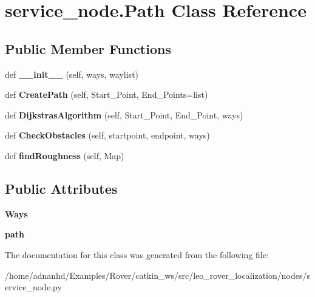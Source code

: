 \hypertarget{classservice__node_1_1Path}{}\section{service\+\_\+node.\+Path Class Reference}
\label{classservice__node_1_1Path}
\subsection*{Public Member Functions}
\begin{DoxyCompactItemize}
\item 
\mbox{\label{classservice__node_1_1Path_ac66df455e00a98279d5db61985b8b3ff}} 
def {\bfseries \+\_\+\+\_\+init\+\_\+\+\_\+} (self, ways, waylist)
\item 
\mbox{\label{classservice__node_1_1Path_a9947fd0a2a144ef57cd75ed3f68829e0}} 
def {\bfseries Create\+Path} (self, Start\+\_\+\+Point, End\+\_\+\+Points=list)
\item 
\mbox{\label{classservice__node_1_1Path_a6c2a4122062c23d7789375230a01f2bd}} 
def {\bfseries Dijkstras\+Algorithm} (self, Start\+\_\+\+Point, End\+\_\+\+Point, ways)
\item 
\mbox{\label{classservice__node_1_1Path_a39a4cd3962fbe30c2c3d835d23b6eff9}} 
def {\bfseries Check\+Obstacles} (self, startpoint, endpoint, ways)
\item 
\mbox{\label{classservice__node_1_1Path_a8cf17afe9bdbb156da13e24707f3df38}} 
def {\bfseries find\+Roughness} (self, Map)
\end{DoxyCompactItemize}
\subsection*{Public Attributes}
\begin{DoxyCompactItemize}
\item 
\mbox{\label{classservice__node_1_1Path_a9d0a619d0d0fd5f2167b5229cbf65818}} 
{\bfseries Ways}
\item 
\mbox{\label{classservice__node_1_1Path_a78a66c2a039df6318fe31aa7da84754b}} 
{\bfseries path}
\end{DoxyCompactItemize}


The documentation for this class was generated from the following file\+:\begin{DoxyCompactItemize}
\item 
/home/adnanhd/\+Examples/\+Rover/catkin\+\_\+ws/src/leo\+\_\+rover\+\_\+localization/nodes/service\+\_\+node.\+py\end{DoxyCompactItemize}
